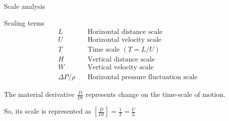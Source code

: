 \documentclass[aspectratio=169,xcolor=dvipsnames]{beamer}
\begin{document}
\begin{frame}{Scale analysis}
    \begin{center}
    \begin{minipage}[t]{0.6\textwidth}
    \begin{block}{Scaling terms}
        \vspace{-1.2em}
        \begin{align*}
            L \quad & \text{Horizontal distance scale} \\
            U \quad & \text{Horizontal velocity scale} \\
            T \quad & \text{Time scale }(T=L/U) \\
            H \quad & \text{Vertical distance scale} \\
            W \quad & \text{Vertical velocity scale} \\
            \Delta P/\rho \quad & \text{Horizontal pressure fluctuation scale}
        \end{align*}
    \end{block}
    \end{minipage}
    \end{center}
    
    \vspace{2em}
    
    The material derivative $\frac{D}{Dt}$ represents change on the time-scale of motion.

    So, its scale is represented as $\left[\frac{D}{Dt}\right]=\frac{1}{T}=\frac{U}{L}$
\end{frame}

\end{document}
